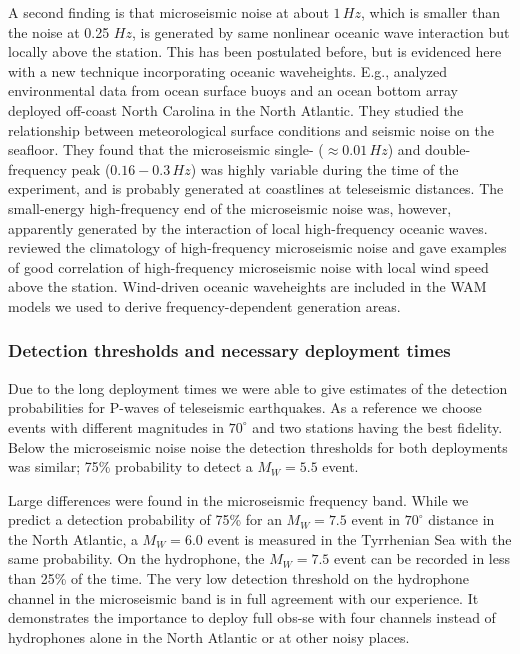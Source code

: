 \documentclass{article}
\begin{document}
{A second finding is that microseismic noise at about $1\, Hz$, 
which is smaller than the noise at 0.25 $Hz$,
is generated by same nonlinear oceanic wave interaction 
but locally above the station.
This has been postulated before, but is evidenced here with 
a new technique incorporating oceanic waveheights.
E.g., 
\cite{babcock:94}
analyzed environmental data from ocean surface buoys and an ocean bottom 
array deployed off-coast North Carolina in the North Atlantic. 
They studied the relationship between meteorological surface conditions 
and seismic noise on the seafloor. 
They found that the microseismic single- ($\approx 0.01\, Hz$) and 
double-frequency  peak ($0.16 - 0.3\, Hz$) 
was highly variable during the time of the experiment, and is 
probably generated at coastlines at teleseismic distances. 
The small-energy high-frequency end of the microseismic noise was, however, 
apparently generated by the interaction of local high-frequency oceanic waves.
\cite{webb:98} reviewed the climatology of high-frequency microseismic noise
and gave examples of good correlation of high-frequency microseismic noise 
with local wind speed above the station.
Wind-driven oceanic waveheights are included in the WAM models we used
to derive frequency-dependent generation areas.



\subsubsection*{Detection thresholds and 
necessary deployment times}
Due to the long deployment times we were able to 
give estimates of the detection probabilities for 
P-waves of teleseismic earthquakes.
As a reference we choose events with different magnitudes in $70^{\circ}$ and 
two stations having the best fidelity.
Below the microseismic noise noise the detection thresholds 
for both deployments was similar; 
75\% probability to detect a $M_W = 5.5$ event.

Large differences were found in the microseismic frequency band.
While we predict a detection probability of 
75\% for an $M_W =7.5$ event in $70^{\circ}$ distance in the North 
Atlantic, a   
$M_W =6.0$ event is measured in the Tyrrhenian Sea with the same 
probability.
On the hydrophone, the 
$M_W =7.5$ event can be recorded in less than 25\% of the time.
The very low detection threshold on the hydrophone channel 
in the microseismic band is in full agreement with our experience. 
It demonstrates the importance to deploy full obs-se with four channels 
instead of hydrophones alone 
in the North Atlantic or at other noisy places.


}
\end{document}

